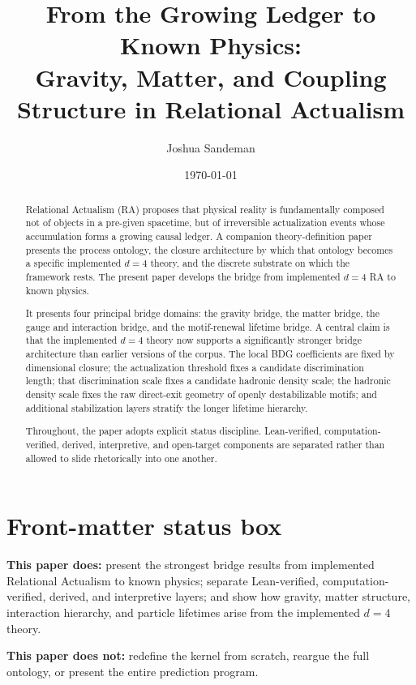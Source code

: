\documentclass[11pt]{article}
\title{From the Growing Ledger to Known Physics: \\ Gravity, Matter, and Coupling Structure in Relational Actualism}
\author{Joshua Sandeman}
\date{\today}
\begin{document}
\maketitle

\begin{abstract}
Relational Actualism (RA) proposes that physical reality is fundamentally composed not of objects in a pre-given spacetime, but of irreversible actualization events whose accumulation forms a growing causal ledger. A companion theory-definition paper presents the process ontology, the closure architecture by which that ontology becomes a specific implemented $d=4$ theory, and the discrete substrate on which the framework rests. The present paper develops the bridge from implemented $d=4$ RA to known physics.

It presents four principal bridge domains: the gravity bridge, the matter bridge, the gauge and interaction bridge, and the motif-renewal lifetime bridge. A central claim is that the implemented $d=4$ theory now supports a significantly stronger bridge architecture than earlier versions of the corpus. The local BDG coefficients are fixed by dimensional closure; the actualization threshold fixes a candidate discrimination length; that discrimination scale fixes a candidate hadronic density scale; the hadronic density scale fixes the raw direct-exit geometry of openly destabilizable motifs; and additional stabilization layers stratify the longer lifetime hierarchy.

Throughout, the paper adopts explicit status discipline. Lean-verified, computation-verified, derived, interpretive, and open-target components are separated rather than allowed to slide rhetorically into one another.
\end{abstract}

\section*{Front-matter status box}
\noindent\textbf{This paper does:} present the strongest bridge results from implemented Relational Actualism to known physics; separate Lean-verified, computation-verified, derived, and interpretive layers; and show how gravity, matter structure, interaction hierarchy, and particle lifetimes arise from the implemented $d=4$ theory.

\noindent\textbf{This paper does not:} redefine the kernel from scratch, reargue the full ontology, or present the entire prediction program.
\end{document}
